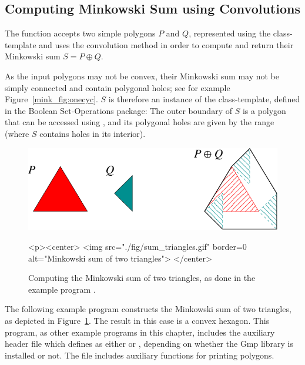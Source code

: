 \subsection{Computing Minkowski Sum using Convolutions\label{mink_ssec:sum_conv}}

The function  accepts two simple polygons $P$
and $Q$, represented using the 
class-template and uses the convolution method in order to compute and
return their Minkowski sum $S = P \oplus Q$.

As the input polygons may not be convex, their Minkowski sum may not be
simply connected and contain polygonal holes; see for example
Figure~\ref{mink_fig:onecyc}. $S$ is therefore an instance of the
 class-template, defined in the
Boolean Set-Operations package: The outer boundary of $S$ is a polygon that
can be accessed using , and its polygonal holes 
are given by the range \ccc{[S.holes_begin(), S.holes_end())} (where $S$
contains  holes in its interior).

\begin{figure}[t]
\begin{ccTexOnly}
  \begin{center}
    \includegraphics{Minkowski_sum_2/fig/sum_triangles}
  \end{center}
\end{ccTexOnly}
\begin{ccHtmlOnly}
  <p><center>
  <img src="./fig/sum_triangles.gif" border=0 alt="Minkowski sum of two triangles">
  </center>
\end{ccHtmlOnly}
\caption{Computing the Minkowski sum of two triangles, as done
in the example program .}
\label{mink_fig:sum_tri}
\end{figure}

The following example program constructs the Minkowski sum of two triangles,
as depicted in Figure~\ref{mink_fig:sum_tri}. The result in this case is
a convex hexagon. This program, as other example programs in this chapter,
includes the auxiliary header file  which defines
 as either  or ,
depending on whether the {\sc Gmp} library is installed or not.
The file  includes auxiliary functions for printing polygons.

